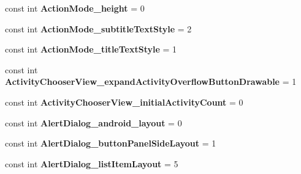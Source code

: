 \begin{DoxyCompactItemize}
\mbox{\label{class_sample_app_1_1_droid_1_1_resource_1_1_styleable_a553ff182d175dd33280041b2cadede3c}} 
const int {\bfseries Action\+Mode\+\_\+height} = 0
\item 
\mbox{\label{class_sample_app_1_1_droid_1_1_resource_1_1_styleable_a4c0b268b789bb4e50f7fb656a2cbfd40}} 
const int {\bfseries Action\+Mode\+\_\+subtitle\+Text\+Style} = 2
\item 
\mbox{\label{class_sample_app_1_1_droid_1_1_resource_1_1_styleable_a7e48bc31762fda3ce0e8aa985a247ac1}} 
const int {\bfseries Action\+Mode\+\_\+title\+Text\+Style} = 1
\item 
\mbox{\label{class_sample_app_1_1_droid_1_1_resource_1_1_styleable_a37ad289275e5e572f25cda4385e67c26}} 
const int {\bfseries Activity\+Chooser\+View\+\_\+expand\+Activity\+Overflow\+Button\+Drawable} = 1
\item 
\mbox{\label{class_sample_app_1_1_droid_1_1_resource_1_1_styleable_a080936fd70cdc87ca5470b85e5ecf321}} 
const int {\bfseries Activity\+Chooser\+View\+\_\+initial\+Activity\+Count} = 0
\item 
\mbox{\label{class_sample_app_1_1_droid_1_1_resource_1_1_styleable_a6e1354aec2e20f4963bb7a5e89d2093e}} 
const int {\bfseries Alert\+Dialog\+\_\+android\+\_\+layout} = 0
\item 
\mbox{\label{class_sample_app_1_1_droid_1_1_resource_1_1_styleable_abf4126d263ff40f2d7a570d4d073f8a9}} 
const int {\bfseries Alert\+Dialog\+\_\+button\+Panel\+Side\+Layout} = 1
\item 
\mbox{\label{class_sample_app_1_1_droid_1_1_resource_1_1_styleable_a6ae9fc5e9b01380ddf7ea79e7f8e06f4}} 
const int {\bfseries Alert\+Dialog\+\_\+list\+Item\+Layout} = 5
\item 
\mbox{\label{class_sample_app_1_1_droid_1_1_resource_1_1_styleable_a85f85fddc1c20d5b2f8d8bf7ab6b27fe}} 

\end{DoxyCompactItemize}
